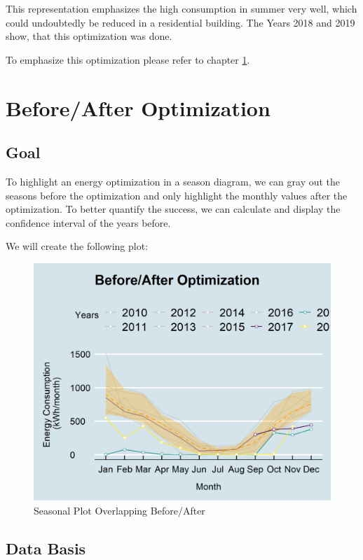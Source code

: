 \documentclass[
  a4paperpaper,
]{book}
\begin{document}
This representation emphasizes the high consumption in summer very well, which could undoubtedly be reduced in a residential building. The Years 2018 and 2019 show, that this optimization was done.

To emphasize this optimization please refer to chapter \ref{dataVisSeasonalBefAft}.

\newpage

\hypertarget{dataVisSeasonalBefAft}{%
\section{Before/After Optimization}\label{dataVisSeasonalBefAft}}

\hypertarget{goal-9}{%
\subsection{Goal}\label{goal-9}}

To highlight an energy optimization in a season diagram, we can gray out the seasons before the optimization and only highlight the monthly values after the optimization. To better quantify the success, we can calculate and display the confidence interval of the years before.

We will create the following plot:

\begin{figure}
\includegraphics[width=0.7\linewidth]{images/plotEnergyConsBeforeAfter} \caption{Seasonal Plot Overlapping Before/After}\label{fig:unnamed-chunk-18}
\end{figure}

\hypertarget{data-basis-9}{%
\subsection{Data Basis}\label{data-basis-9}}
\end{document}
